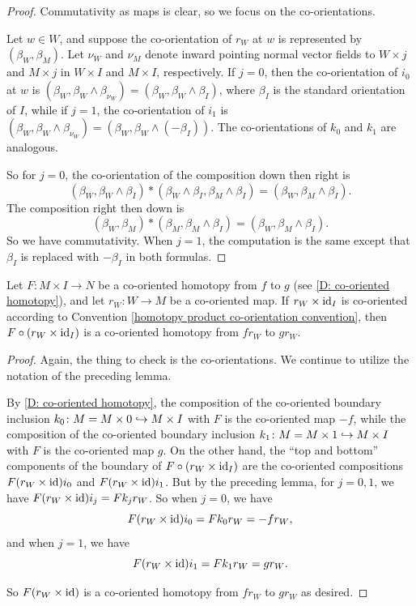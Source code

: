 \begin{proof}
	Commutativity as maps is clear, so we focus on the co-orientations.

	Let $w \in W$, and suppose the co-orientation of $r_W$ at $w$ is represented by $(\beta_W, \beta_M)$.
	Let $\nu_W$ and $\nu_M$ denote inward pointing normal vector fields to $W \times j$ and $M \times j$ in $W \times I$ and $M \times I$, respectively. If $j=0$, then the co-orientation of $i_0$ at $w$ is $(\beta_W, \beta_W \wedge \beta_{\nu_W}) = (\beta_W, \beta_W \wedge \beta_I)$, where $\beta_I$ is the standard orientation of $I$, while if $j=1$, the co-orientation of $i_1$ is $(\beta_W, \beta_W \wedge \beta_{\nu_W}) = (\beta_W, \beta_W \wedge (-\beta_I))$. The co-orientations of $k_0$ and $k_1$ are analogous.

	So for $j=0$, the co-orientation of the composition down then right is $$(\beta_W, \beta_W \wedge \beta_I) * (\beta_W \wedge \beta_I, \beta_M \wedge \beta_I) = (\beta_W, \beta_M \wedge \beta_I).$$
	The composition right then down is $$(\beta_W, \beta_M) * (\beta_M, \beta_M \wedge \beta_I) = (\beta_W , \beta_M \wedge \beta_I).$$
	So we have commutativity.
	When $j=1$, the computation is the same except that $\beta_I$ is replaced with $-\beta_I$ in both formulas.
\end{proof}

\begin{corollary}\label{C: universal homotopy boundary co-orientation}
	Let $F \colon M \times I \to N$ be a co-oriented homotopy from $f$ to $g$ (see \cref{D: co-oriented homotopy}), and let $r_W \colon W \to M$ be a co-oriented map.
	If $r_W \times \mathrm{id}_I$ is co-oriented according to Convention \ref{homotopy product co-orientation convention}, then $F \circ (r_W \times \mathrm{id}_I)$ is a co-oriented homotopy from $fr_W$ to $gr_W$.
\end{corollary}

\begin{proof}
	Again, the thing to check is the co-orientations. We continue to utilize the notation of the preceding lemma.

	By \cref{D: co-oriented homotopy}, the composition of the co-oriented boundary inclusion $k_0 \colon M = M \times 0 \hookrightarrow M \times I$ with $F$ is the co-oriented map $-f$, while the composition of the co-oriented boundary inclusion $k_1 \colon M = M \times 1 \hookrightarrow M \times I$ with $F$ is the co-oriented map
	$g$. On the other hand, the ``top and bottom'' components of the boundary of $F \circ (r_W \times \mathrm{id}_I)$ are the co-oriented compositions $F (r_W\times \mathrm{id}) i_0$ and $F (r_W\times \mathrm{id}) i_1$.
	But by the preceding lemma, for $j=0,1$, we have $F (r_W\times \mathrm{id}) i_j = F k_j r_W$.
	So when $j=0$, we have
	$$ F (r_W\times \mathrm{id}) i_0 = F k_0 r_W = -f r_W,$$
	and when $j=1$, we have
	$$ F (r_W\times \mathrm{id}) i_1 = F k_1 r_W = g r_W.$$

	So $F (r_W\times \mathrm{id})$ is a co-oriented homotopy from $fr_W$ to $gr_W$ as desired.
\end{proof}

